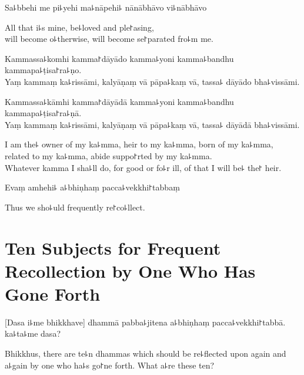 Sa꜕bbehi me pi꜕yehi ma꜕nāpehi꜕ nānābhāvo vi꜕nābhāvo

\begin{english}
  All that i꜕s mine, be꜕loved and ple꜓asing,\\
  will become o꜕therwise, will become se꜓parated fro꜕m me.
\end{english}

%
Kammassa꜕komhi kamma꜓dāyādo kamma꜕yoni kamma꜕bandhu kammapa꜕ṭisa꜓ra꜕ṇo.\\
Yaṃ kammaṃ ka꜕rissāmi, kalyāṇaṃ vā pāpa꜕kaṃ vā, tassa꜕ dāyādo bha꜕vissāmi.

\clearpage

%
Kammassa꜕kāmhi kamma꜓dāyādā kamma꜕yoni kamma꜕bandhu kammapa꜕ṭisa꜓ra꜕ṇā.\\
Yaṃ kammaṃ ka꜕rissāmi, kalyāṇaṃ vā pāpa꜕kaṃ vā, tassa꜕ dāyādā bha꜕vissāmi.

\begin{english}
  I am the꜕ owner of my ka꜕mma, heir to my ka꜕mma, born of my ka꜕mma,\\
  related to my ka꜕mma, abide suppo꜓rted by my ka꜕mma.\\
  Whatever kamma I sha꜕ll do, for good or fo꜕r ill, of that I will be꜕ the꜓ heir.
\end{english}

Evaṃ amhehi꜕ a꜕bhiṇhaṃ pacca꜕vekkhi꜓tabbaṃ

\begin{english}
  Thus we sho꜕uld frequently re꜓co꜕llect.
\end{english}

\chapter[Ten Subjects]{Ten Subjects for Frequent Recollection by One Who Has Gone Forth}%


\enlargethispage{\baselineskip}

\begin{leader}
\end{leader}

[Dasa i꜕me bhikkhave] dhammā pabba꜕jitena a꜕bhiṇhaṃ pacca꜕vekkhi꜓tabbā. ka꜕ta꜕me dasa?

\begin{english}
  Bhikkhus, there are te꜕n dhammas which should be re꜕flected upon again and a꜕gain by one who ha꜕s go꜓ne forth. What a꜕re these ten?
\end{english}

